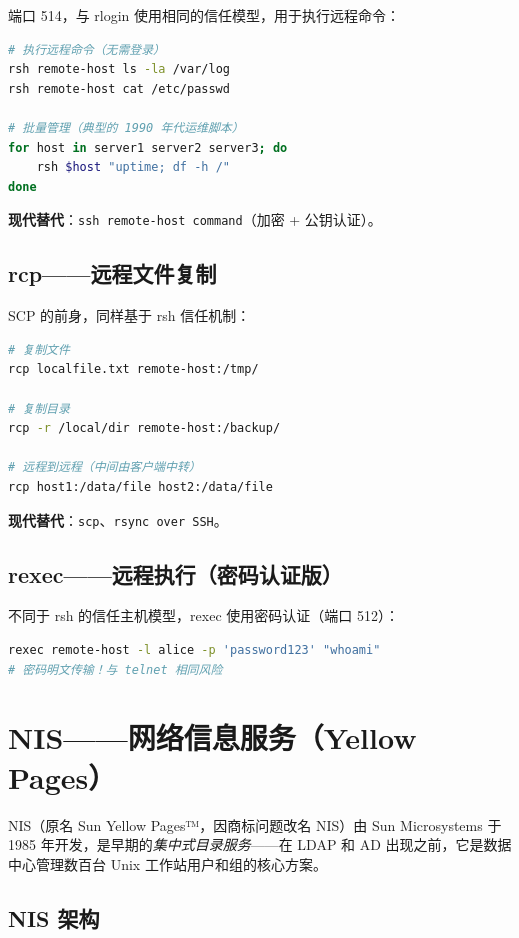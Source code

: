 \documentclass[12pt,UTF8]{ctexbook}
\begin{document}
端口 514，与 rlogin 使用相同的信任模型，用于执行远程命令：

\begin{lstlisting}[language=bash]
# 执行远程命令（无需登录）
rsh remote-host ls -la /var/log
rsh remote-host cat /etc/passwd

# 批量管理（典型的 1990 年代运维脚本）
for host in server1 server2 server3; do
    rsh $host "uptime; df -h /"
done
\end{lstlisting}

\textbf{现代替代}：\texttt{ssh remote-host command}（加密 + 公钥认证）。

\subsection{rcp——远程文件复制}

SCP 的前身，同样基于 rsh 信任机制：

\begin{lstlisting}[language=bash]
# 复制文件
rcp localfile.txt remote-host:/tmp/

# 复制目录
rcp -r /local/dir remote-host:/backup/

# 远程到远程（中间由客户端中转）
rcp host1:/data/file host2:/data/file
\end{lstlisting}

\textbf{现代替代}：\texttt{scp}、\texttt{rsync over SSH}。

\subsection{rexec——远程执行（密码认证版）}

不同于 rsh 的信任主机模型，rexec 使用密码认证（端口 512）：

\begin{lstlisting}[language=bash]
rexec remote-host -l alice -p 'password123' "whoami"
# 密码明文传输！与 telnet 相同风险
\end{lstlisting}

\section{NIS——网络信息服务（Yellow Pages）}
\label{sec:nis}

NIS（原名 Sun Yellow Pages™，因商标问题改名 NIS）由 Sun Microsystems 于 1985 年开发，是早期的\emph{集中式目录服务}——在 LDAP 和 AD 出现之前，它是数据中心管理数百台 Unix 工作站用户和组的核心方案。

\subsection{NIS 架构}
\end{document}
